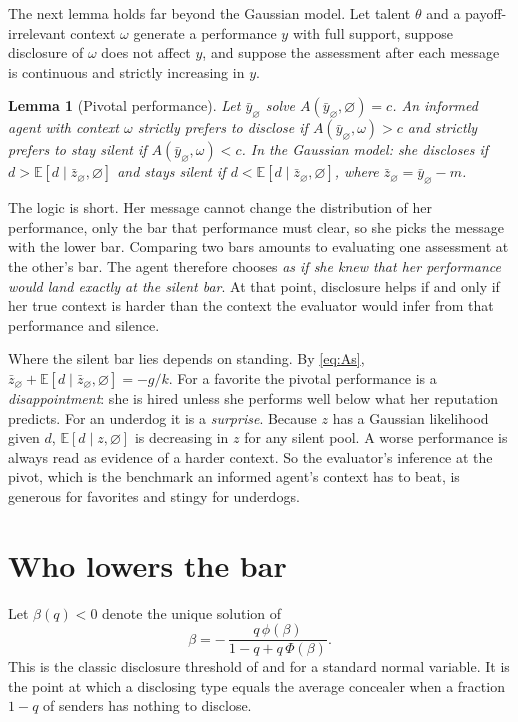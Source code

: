 \documentclass[11pt]{article}
\newtheorem{lemma}{Lemma}
\theoremstyle{definition}
\newcommand{\E}{\mathbb{E}}
\newcommand{\sil}{\varnothing}
\begin{document}
The next lemma holds far beyond the Gaussian model. Let talent $\theta$ and a payoff-irrelevant context $\omega$ generate a performance $y$ with full support, suppose disclosure of $\omega$ does not affect $y$, and suppose the assessment after each message is continuous and strictly increasing in $y$.

\begin{lemma}[Pivotal performance]\label{lem:pivotal}
Let $\bar y_\sil$ solve $A(\bar y_\sil,\sil)=c$. An informed agent with context $\omega$ strictly prefers to disclose if $A(\bar y_\sil,\omega)>c$ and strictly prefers to stay silent if $A(\bar y_\sil,\omega)<c$. In the Gaussian model: she discloses if $d>\E[d\mid \bar z_\sil,\sil]$ and stays silent if $d<\E[d\mid\bar z_\sil,\sil]$, where $\bar z_\sil=\bar y_\sil-m$.
\end{lemma}

The logic is short. Her message cannot change the distribution of her performance, only the bar that performance must clear, so she picks the message with the lower bar. Comparing two bars amounts to evaluating one assessment at the other's bar. The agent therefore chooses \emph{as if she knew that her performance would land exactly at the silent bar}. At that point, disclosure helps if and only if her true context is harder than the context the evaluator would infer from that performance and silence.

Where the silent bar lies depends on standing. By \eqref{eq:As}, $\bar z_\sil+\E[d\mid\bar z_\sil,\sil]=-g/k$. For a favorite the pivotal performance is a \emph{disappointment}: she is hired unless she performs well below what her reputation predicts. For an underdog it is a \emph{surprise}. Because $z$ has a Gaussian likelihood given $d$, $\E[d\mid z,\sil]$ is decreasing in $z$ for any silent pool. A worse performance is always read as evidence of a harder context. So the evaluator's inference at the pivot, which is the benchmark an informed agent's context has to beat, is generous for favorites and stingy for underdogs.

\section{Who lowers the bar}\label{sec:main}

Let $\beta(q)<0$ denote the unique solution of
\begin{equation}\label{eq:beta}
\beta=-\,\frac{q\,\phi(\beta)}{1-q+q\,\Phi(\beta)} .
\end{equation}
This is the classic disclosure threshold of \citet{Dye1985} and \citet{JungKwon1988} for a standard normal variable. It is the point at which a disclosing type equals the average concealer when a fraction $1-q$ of senders has nothing to disclose.
\end{document}
